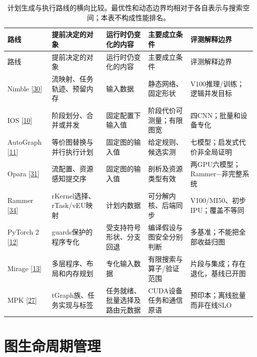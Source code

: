 \documentclass[
  UTF8,
  zihao=5]{ctexart}
\begin{document}
\begin{longtable}[]{@{}
  >{\raggedright\arraybackslash}p{}
  >{\raggedright\arraybackslash}p{}
  >{\raggedright\arraybackslash}p{}
  >{\raggedright\arraybackslash}p{}
  >{\raggedright\arraybackslash}p{}@{}}
\caption{计划生成与执行路线的横向比较。最优性和动态边界均相对于各自表示与搜索空间；本表不构成性能排名。}\tabularnewline
\toprule
路线 & 提前决定的对象 & 运行时仍变化的内容 & 主要成立条件 &
评测解释边界 \\
\midrule
\endfirsthead
\toprule
路线 & 提前决定的对象 & 运行时仍变化的内容 & 主要成立条件 &
评测解释边界 \\
\midrule
\endhead
Nimble {[}\protect\hyperlink{ref-kwon2020nimble}{30}{]} &
流映射、任务轨迹、预留内存 & 输入数据 & 静态网络、固定形状 &
V100推理/训练；逻辑并发目标 \\
IOS {[}\protect\hyperlink{ref-ding2021ios}{10}{]} & 阶段划分、合并或并发
& 固定配置下输入值 & 阶段代价可测量；有限图宽 & 四CNN；批量和设备专化 \\
AutoGraph {[}\protect\hyperlink{ref-zhao2023autograph}{11}{]} &
等价图替换与并行执行计划 & 固定图的输入值 & 给定规则、候选实测 &
七模型；启发式代价非全局证明 \\
Opara {[}\protect\hyperlink{ref-chen2025opara}{31}{]} &
流配置、资源感知提交序 & 固定图的输入值 & 剖析及资源类型有效 &
两GPU六模型；Rammer−非完整系统 \\
Rammer {[}\protect\hyperlink{ref-ma2020rammer}{34}{]} &
rKernel选择、rTask/vEU映射 & 计划内数据 & 可分解内核、后端同步 &
V100/MI50、初步IPU；覆盖不等同 \\
PyTorch 2 {[}\protect\hyperlink{ref-ansel2024pytorch2}{12}{]} &
guards保护的程序专化 & 受支持符号形状、分支回退 &
编译假设与图安全分别判断 & 多基准；不能把全部收益归图 \\
Mirage {[}\protect\hyperlink{ref-wu2025mirage}{13}{]} &
多层程序、布局和内存规划 & 专化输入数据 & 有限搜索与算子/验证范围 &
片段与集成；存在退化，基线已开图 \\
MPK {[}\protect\hyperlink{ref-cheng2026mpk}{27}{]} &
tGraph族、任务实现与标签 & 任务就绪、批量选择及路由元数据 &
CUDA设备任务和通信原语 & 预印本；离线批量而非在线SLO \\
\bottomrule
\end{longtable}

\hypertarget{lifecycle}{%
\section{图生命周期管理}\label{lifecycle}}
\end{document}
